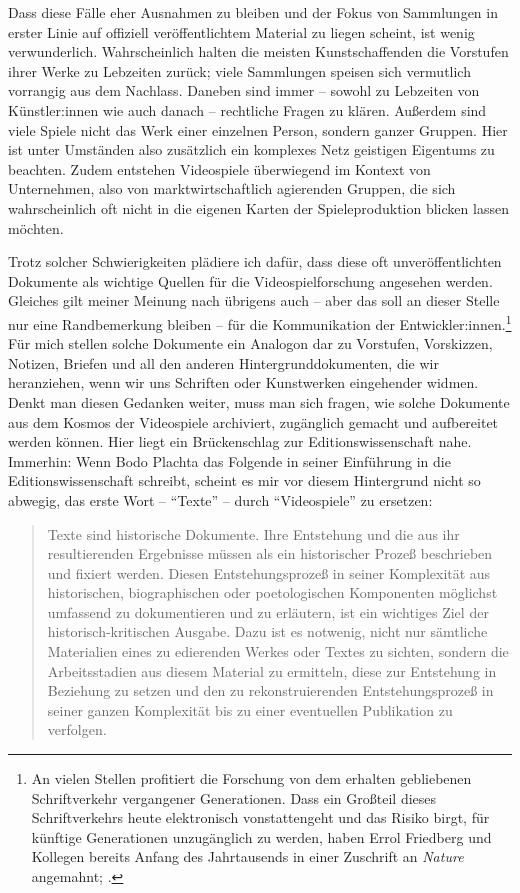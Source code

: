 \documentclass[a5paper,pagesize,numbers=noenddot]{scrbook}
\begin{document}
Dass diese Fälle eher Ausnahmen zu bleiben und der Fokus von Sammlungen in erster Linie auf offiziell veröffentlichtem Material zu liegen scheint, ist wenig verwunderlich.
Wahrscheinlich halten die meisten Kunstschaffenden die Vorstufen ihrer Werke zu Lebzeiten zurück; viele Sammlungen speisen sich vermutlich vorrangig aus dem Nachlass.
Daneben sind immer -- sowohl zu Lebzeiten von Künstler:innen wie auch danach -- rechtliche Fragen zu klären.
Außerdem sind viele Spiele nicht das Werk einer einzelnen Person, sondern ganzer Gruppen.
Hier ist unter Umständen also zusätzlich ein komplexes Netz geistigen Eigentums zu beachten.
Zudem entstehen Videospiele überwiegend im Kontext von Unternehmen, also von marktwirtschaftlich agierenden Gruppen, die sich wahrscheinlich oft nicht in die eigenen Karten der Spieleproduktion blicken lassen möchten.

Trotz solcher Schwierigkeiten plädiere ich dafür, dass diese oft unveröffentlichten Dokumente als wichtige Quellen für die Videospielforschung angesehen werden.
Gleiches gilt meiner Meinung nach übrigens auch -- aber das soll an dieser Stelle nur eine Randbemerkung bleiben -- für die Kommunikation der Entwickler:innen.\footnote{An vielen Stellen profitiert die Forschung von dem erhalten gebliebenen Schriftverkehr vergangener Generationen. Dass ein Großteil dieses Schriftverkehrs heute elektronisch vonstattengeht und das Risiko birgt, für künftige Generationen unzugänglich zu werden, haben Errol Friedberg und Kollegen bereits Anfang des Jahrtausends in einer Zuschrift an \textit{Nature} angemahnt; \autocite[vgl.][]{friedberg_e_mail_2003}.}
Für mich stellen solche Dokumente ein Analogon dar zu Vorstufen, Vorskizzen, Notizen, Briefen und all den anderen Hintergrunddokumenten, die wir heranziehen, wenn wir uns Schriften oder Kunstwerken eingehender widmen.
Denkt man diesen Gedanken weiter, muss man sich fragen, wie solche Dokumente aus dem Kosmos der Videospiele archiviert, zugänglich gemacht und aufbereitet werden können.
Hier liegt ein Brückenschlag zur Editionswissenschaft nahe.
Immerhin:
Wenn Bodo Plachta das Folgende in seiner Einführung in die Editionswissenschaft schreibt, scheint es mir vor diesem Hintergrund nicht so abwegig, das erste Wort -- \enquote{Texte} -- durch \enquote{Videospiele} zu ersetzen:

\begin{quote}
   Texte sind historische Dokumente.
   Ihre Entstehung und die aus ihr resultierenden Ergebnisse müssen als ein historischer Prozeß beschrieben und fixiert werden.
   Diesen Entstehungsprozeß in seiner Komplexität aus historischen, biographischen oder poetologischen Komponenten möglichst umfassend zu dokumentieren und zu erläutern, ist ein wichtiges Ziel der historisch-kritischen Ausgabe.
   Dazu ist es notwenig, nicht nur sämtliche Materialien eines zu edierenden Werkes oder Textes zu sichten, sondern die Arbeitsstadien aus diesem Material zu ermitteln, diese zur Entstehung in Beziehung zu setzen und den zu rekonstruierenden Entstehungsprozeß in seiner ganzen Komplexität bis zu einer eventuellen Publikation zu verfolgen.\autocite[S.~13\,f.]{plachta_editionswissenschaft_1997}
\end{quote}
\end{document}
